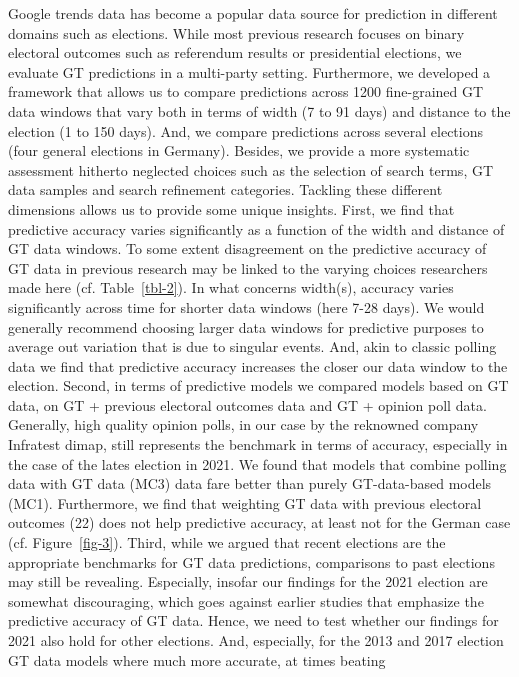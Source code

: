 \documentclass[
  letterpaper,
  DIV=11,
  numbers=noendperiod]{scrartcl}
\begin{document}
Google trends data has become a popular data source for prediction in
different domains such as elections. While most previous research
focuses on binary electoral outcomes such as referendum results or
presidential elections, we evaluate GT predictions in a multi-party
setting. Furthermore, we developed a framework that allows us to compare
predictions across 1200 fine-grained GT data windows that vary both in
terms of width (7 to 91 days) and distance to the election (1 to 150
days). And, we compare predictions across several elections (four
general elections in Germany). Besides, we provide a more systematic
assessment hitherto neglected choices such as the selection of search
terms, GT data samples and search refinement categories. Tackling these
different dimensions allows us to provide some unique insights. First,
we find that predictive accuracy varies significantly as a function of
the width and distance of GT data windows. To some extent disagreement
on the predictive accuracy of GT data in previous research may be linked
to the varying choices researchers made here (cf. Table~\ref{tbl-2}). In
what concerns width(s), accuracy varies significantly across time for
shorter data windows (here 7-28 days). We would generally recommend
choosing larger data windows for predictive purposes to average out
variation that is due to singular events. And, akin to classic polling
data we find that predictive accuracy increases the closer our data
window to the election. Second, in terms of predictive models we
compared models based on GT data, on GT + previous electoral outcomes
data and GT + opinion poll data. Generally, high quality opinion polls,
in our case by the reknowned company Infratest dimap, still represents
the benchmark in terms of accuracy, especially in the case of the lates
election in 2021. We found that models that combine polling data with GT
data (MC3) data fare better than purely GT-data-based models (MC1).
Furthermore, we find that weighting GT data with previous electoral
outcomes (22) does not help predictive accuracy, at least not for the
German case (cf. Figure~\ref{fig-3}). Third, while we argued that recent
elections are the appropriate benchmarks for GT data predictions,
comparisons to past elections may still be revealing. Especially,
insofar our findings for the 2021 election are somewhat discouraging,
which goes against earlier studies that emphasize the predictive
accuracy of GT data. Hence, we need to test whether our findings for
2021 also hold for other elections. And, especially, for the 2013 and
2017 election GT data models where much more accurate, at times beating
\end{document}
